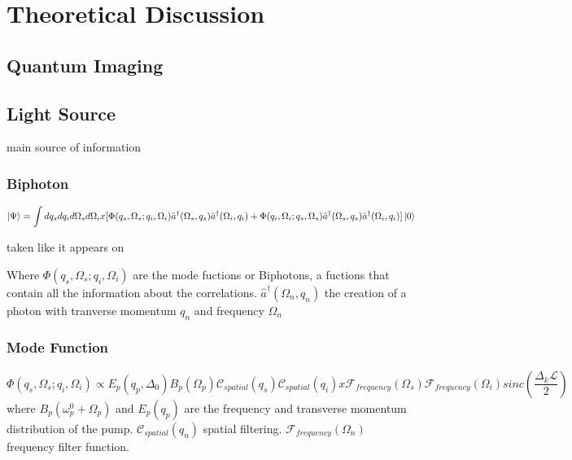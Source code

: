 
\chapter{Theoretical Discussion} %

\label{Chapter2} %


\section{Quantum Imaging}



\section{Light Source}

main source of information \cite{physicsGhost}
\subsection{Biphoton}

\begin{equation}
\ket{\Psi}=\int dq_s dq_i d\Omega_s d\Omega_i 
x [\Phi(q_s,\Omega_s;q_i,\Omega_i) \hat{a}^{\dagger} (\Omega_s,q_s) \hat{a}^{\dagger}(\Omega_i,q_i) \\
+ \Phi(q_i,\Omega_i;q_s,\Omega_s) \hat{a}^{\dagger}(\Omega_s,q_s) \hat{a}^{\dagger}(\Omega_i,q_i)]   \ket{0}  
\end{equation}

taken like it appears on \cite{spatiocorrelations}

 Where $\Phi(q_s,\Omega_s;q_i,\Omega_i)$ are the mode fuctions or Biphotons, a fuctions that contain all the information about the correlations. $ \hat{a}^{\dagger}(\Omega_n,q_n)$ the creation of a photon with tranverse momentum $q_n$ and frequency $\Omega_n$


\subsection{Mode Function}
\begin{equation}
\Phi(q_s,\Omega_s;q_i,\Omega_i) \propto E_p(q_p,\Delta_0) B_p(\Omega_p) \mathcal{C}_{spatial}(q_s) \mathcal{C}_{spatial}(q_i) 
 x \mathcal{F}_{frequency}(\Omega_s) \mathcal{F}_{frequency}(\Omega_i) sinc \left( \frac{\Delta_k \mathcal{L}}{2} \right)
\end{equation}
where $B_p(\omega^0_p+\Omega_p)$ and $E_p(q_p)$ are the frequency and transverse momentum distribution of the pump. $\mathcal{C}_{spatial}(q_n)$ spatial filtering. $\mathcal{F}_{frequency}(\Omega_n)$ frequency filter function.

